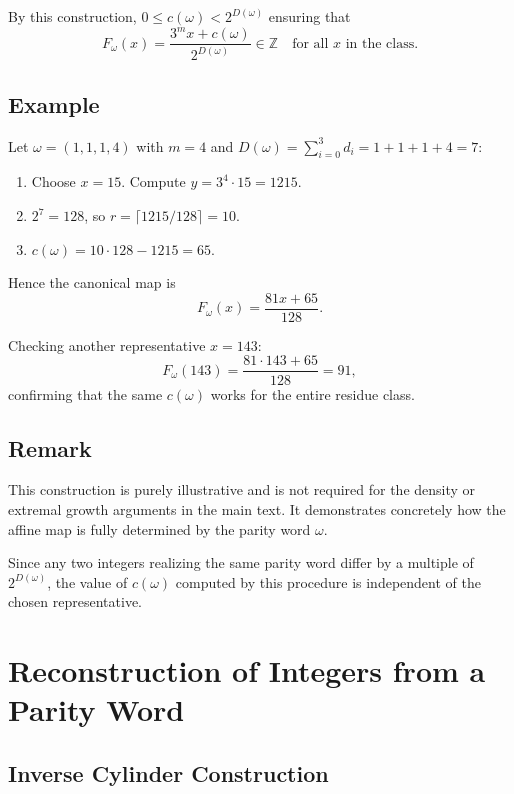 \documentclass[12pt, oneside]{article}   	%
\numberwithin{equation}{section}          %
\theoremstyle{definition}
\begin{document}
By this construction, \(0 \le c(\omega) < 2^{D(\omega)}\) ensuring that
\[
F_\omega(x) = \frac{3^m x + c(\omega)}{2^{D(\omega)}} \in \mathbb{Z} \quad \text{for all } x \text{ in the class.}
\]

\newpage
\subsection{Example}

Let \(\omega = (1,1,1,4)\) with \(m=4\) and \(D(\omega) = \sum_{i=0}^{3} d_i = 1 + 1 + 1 + 4 = 7\):

\begin{enumerate}
\item Choose \(x = 15\). Compute \(y = 3^4 \cdot 15 = 1215\).  
\item \(2^7 = 128\), so \(r = \lceil 1215/128 \rceil = 10\).  
\item \(c(\omega) = 10 \cdot 128 - 1215 = 65\).  
\end{enumerate}

Hence the canonical map is
\[
F_\omega(x) = \frac{81x + 65}{128}.
\]

Checking another representative \(x = 143\):
\[
F_\omega(143) = \frac{81 \cdot 143 + 65}{128} = 91,
\]
confirming that the same \(c(\omega)\) works for the entire residue class.

\subsection*{Remark}

This construction is purely illustrative and is not required for the density
or extremal growth arguments in the main text. It demonstrates concretely
how the affine map is fully determined by the parity word \(\omega\).

Since any two integers realizing the same parity word differ by a multiple of $2^{D(\omega)}$,
the value of $c(\omega)$ computed by this procedure is independent of the chosen
representative.


\newpage
\section{Reconstruction of Integers from a Parity Word}
\label{app:reconstruction}

\subsection{Inverse Cylinder Construction}
\end{document}
